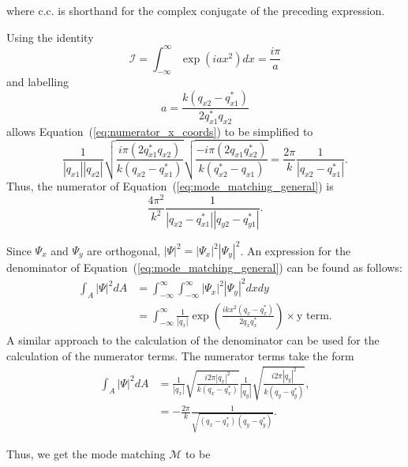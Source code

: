 where c.c. is shorthand for the complex conjugate of the preceding expression.
\par
Using the identity
\begin{equation}
\mathcal{I} = \int_{-\infty}^{\infty} \exp\left(iax^2\right)dx = \frac{i\pi}{a}
\end{equation}
and labelling 
\begin{equation}
a = \frac{k\left(q_{x2} - q_{x1}^*\right)}{2q_{x1}^*q_{x2}}
\end{equation}
allows Equation~(\ref{eq:numerator_x_coords}) to be simplified to 
\begin{equation}
\frac{1}{\left|q_{x1}\right|\left|q_{x2}\right|}\sqrt{\frac{i\pi\left(2q_{x1}^*q_{x2}\right)}{k\left(q_{x2} - q_{x1}^*\right)}}\sqrt{\frac{-i\pi\left(2q_{x1}q_{x2}^*\right)}{k\left(q_{x2}^* - q_{x1}\right)}}
= \frac{2\pi}{k}\frac{1}{\left|q_{x2} - q_{x1}^*\right|}.
\end{equation}
Thus, the numerator of Equation~(\ref{eq:mode_matching_general}) is
\begin{equation}
\frac{4\pi^2}{k^2}\frac{1}{\left|q_{x2} - q_{x1}^*\right|\left|q_{y2} - q_{y1}^*\right|}.
\end{equation}
\par
Since $\Psi_x$ and $\Psi_y$ are orthogonal, $\left|\Psi\right|^2 = \left|\Psi_x\right|^2\left|\Psi_y\right|^2 $. An expression for the denominator of Equation~(\ref{eq:mode_matching_general}) can be found as follows:
\begin{align}
\int_A \left|\Psi\right|^2 dA &= \int_{-\infty}^{\infty}\int_{-\infty}^{\infty} \left|\Psi_x\right|^2\left|\Psi_y\right|^2 dx dy \\
&= \int_{-\infty}^{\infty} \frac{1}{\left|q_x\right|}\exp\left(\frac{ikx^2\left(q_x - q_x^*\right)}{2q_xq_x^*}\right) \times \text{y term}.
\end{align}
A similar approach to the calculation of the denominator can be used for the calculation of the numerator terms. The numerator terms take the form
\begin{align}
\int_A \left|\Psi\right|^2 dA &= \frac{1}{\left|q_x\right|}\sqrt{\frac{i2\pi\left|q_x\right|^2}{k\left(q_x-q_x^*\right)}}\frac{1}{\left|q_y\right|}\sqrt{\frac{i2\pi\left|q_y\right|^2}{k\left(q_y-q_y^*\right)}}, \\
&=-\frac{2\pi}{k}\frac{1}{\sqrt{\left(q_x-q_x^*\right)\left(q_y-q_y^*\right)}}.
\end{align}
\par
Thus, we get the mode matching $\mathcal{M}$ to be
